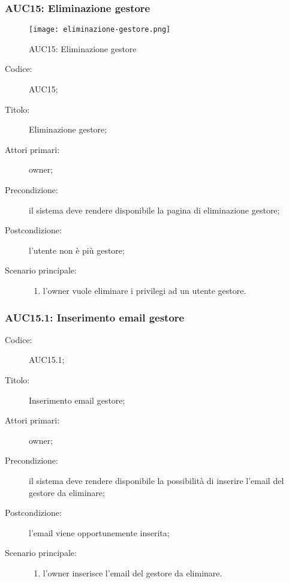 \documentclass[../../../analisi-dei-requisiti.tex]{subfiles}
\begin{document}
\subsubsection{AUC15: Eliminazione gestore}%
\label{subs:AUC15}

\begin{figure}[H]
  \centering
  \texttt{[image: eliminazione-gestore.png]}
  \caption{AUC15: Eliminazione gestore}%
  \label{fig:AUC15}
\end{figure}

\begin{description}
  \item[Codice:] AUC15;
  \item[Titolo:] Eliminazione gestore;
  \item[Attori primari:] owner;
  \item[Precondizione:] il sistema deve rendere disponibile la pagina di eliminazione gestore;
  \item[Postcondizione:] l'utente non è più gestore;
  \item[Scenario principale:]
  \begin{enumerate}
    \item l'owner vuole eliminare i privilegi ad un utente gestore.
  \end{enumerate}
\end{description}

\subsubsection{AUC15.1: Inserimento email gestore}%
\label{subs:AUC15.1}
\begin{description}
  \item[Codice:] AUC15.1;
  \item[Titolo:] Inserimento email gestore;
  \item[Attori primari:] owner;
  \item[Precondizione:] il sistema deve rendere disponibile la possibilità di inserire l'email del gestore da eliminare;
  \item[Postcondizione:] l'email viene opportunemente inserita;
  \item[Scenario principale:]
  \begin{enumerate}
    \item l'owner inserisce l'email del gestore da eliminare.
  \end{enumerate}
\end{description}
\end{document}
